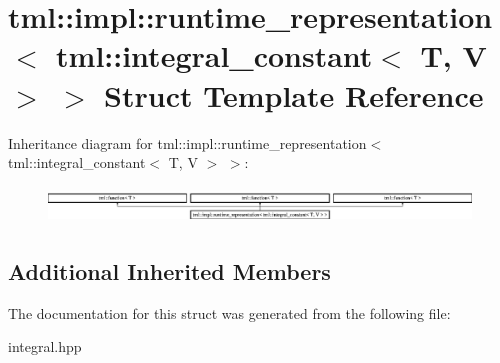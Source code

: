 \hypertarget{structtml_1_1impl_1_1runtime__representation_3_01tml_1_1integral__constant_3_01T_00_01V_01_4_01_4}{\section{tml\+:\+:impl\+:\+:runtime\+\_\+representation$<$ tml\+:\+:integral\+\_\+constant$<$ T, V $>$ $>$ Struct Template Reference}
\label{structtml_1_1impl_1_1runtime__representation_3_01tml_1_1integral__constant_3_01T_00_01V_01_4_01_4}
}
Inheritance diagram for tml\+:\+:impl\+:\+:runtime\+\_\+representation$<$ tml\+:\+:integral\+\_\+constant$<$ T, V $>$ $>$\+:\begin{figure}[H]
\begin{center}
\leavevmode
\includegraphics[height=0.962199cm]{structtml_1_1impl_1_1runtime__representation_3_01tml_1_1integral__constant_3_01T_00_01V_01_4_01_4}
\end{center}
\end{figure}
\subsection*{Additional Inherited Members}


The documentation for this struct was generated from the following file\+:\begin{DoxyCompactItemize}
\item 
integral.\+hpp\end{DoxyCompactItemize}
